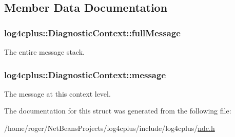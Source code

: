 \subsection{Member Data Documentation}
\hypertarget{structlog4cplus_1_1DiagnosticContext_a4fce057627f5e1cec7a59a4ed4111f11}{
\subsubsection[{full\-Message}]{ log4cplus\-::\-Diagnostic\-Context\-::full\-Message}}\label{structlog4cplus_1_1DiagnosticContext_a4fce057627f5e1cec7a59a4ed4111f11}
The entire message stack. \hypertarget{structlog4cplus_1_1DiagnosticContext_a4f8953ae0220f13316a5905de32da0e3}{
\subsubsection[{message}]{ log4cplus\-::\-Diagnostic\-Context\-::message}}\label{structlog4cplus_1_1DiagnosticContext_a4f8953ae0220f13316a5905de32da0e3}
The message at this context level. 

The documentation for this struct was generated from the following file\-:\begin{DoxyCompactItemize}
\item 
/home/roger/\-Net\-Beans\-Projects/log4cplus/include/log4cplus/\hyperlink{ndc_8h}{ndc.\-h}\end{DoxyCompactItemize}
